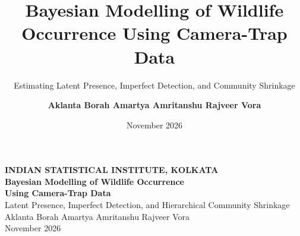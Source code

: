 \documentclass[aspectratio=169,10pt]{beamer}
\title{\textbf{Bayesian Modelling of Wildlife Occurrence Using Camera-Trap Data}}
\subtitle{Estimating Latent Presence, Imperfect Detection, and Community Shrinkage}
\author{\textbf{Aklanta Borah \qquad Amartya Amritanshu \qquad Rajveer Vora}}
\institute{Indian Statistical Institute, Kolkata}
\date{November 2026}
\begin{document}
{
\begin{frame}[c,plain]
  \centering
  {\scriptsize \textbf{\color{accentcyan} INDIAN STATISTICAL INSTITUTE, KOLKATA}}\\[0.25cm]
  {\Large \textbf{\color{white} Bayesian Modelling of Wildlife Occurrence}}\\[0.15cm]
  {\large \textbf{\color{white} Using Camera-Trap Data}}\\[0.25cm]
  {\small \color{white!80} Latent Presence, Imperfect Detection, and Hierarchical Community Shrinkage}\\[0.60cm]
  {\scriptsize \color{white!60} Aklanta Borah \qquad Amartya Amritanshu \qquad Rajveer Vora}\\[0.10cm]
  {\scriptsize \color{white!40} November 2026}
\end{frame}
}
\end{document}
